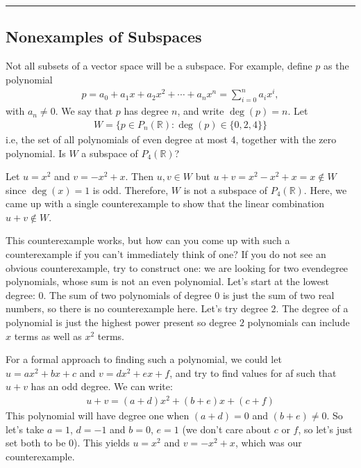\documentclass[letterpaper,10pt,english]{jupyterBook}
\begin{document}
\bigskip\hrule\bigskip



\subsection{Non\sphinxhyphen{}examples of Subspaces}
\label{\detokenize{_pages/5.2_Subspaces:non-examples-of-subspaces}}
\sphinxAtStartPar
Not all subsets of a vector space will be a subspace. For example, define \(p\) as the polynomial
\begin{equation*}
\begin{split} p=a_0 + a_1 x + a_2 x^2 + \cdots + a_n x^n = \sum_{i = 0}^n a_ix^i, \end{split}
\end{equation*}
\sphinxAtStartPar
with \(a_n\neq 0\). We say that \(p\) has degree \(n\), and write \(\operatorname{deg}(p)=n\). Let
\begin{equation*}
\begin{split} W = \{p \in P_n(\mathbb{R}) : \operatorname{deg}(p) \in \{0,2,4\}\} \end{split}
\end{equation*}
\sphinxAtStartPar
i.e, the set of all polynomials of even degree at most 4, together with the zero polynomial. Is \(W\) a subspace of \(P_4(\mathbb{R})\)?

\sphinxAtStartPar
Let \(u = x^2\) and \(v = -x ^ 2 + x\). Then \(u, v \in W\) but \(u + v = x^2 - x^2 + x = x \notin W\) since \(\operatorname{deg}(x) = 1\) is odd. Therefore, \(W\) is not a subspace of \(P_4(\mathbb{R})\). Here, we came up with a single counterexample to show that the linear combination \(u + v \notin W\).

\sphinxAtStartPar
This counterexample works, but how can you come up with such a counterexample if you can’t immediately think of one? If you do not see an obvious counterexample, try to construct one: we are looking for two even\sphinxhyphen{}degree polynomials, whose sum is not an even polynomial. Let’s start at the lowest degree: \(0\). The sum of two polynomials of degree \(0\) is just the sum of two real numbers, so there is no counterexample here. Let’s try degree \(2\). The degree of a polynomial is just the highest power present \sphinxhyphen{} so degree \(2\) polynomials can include \(x\) terms as well as \(x^2\) terms.

\sphinxAtStartPar
For a formal approach to finding such a polynomial, we could let \(u = ax^2 + bx + c\) and \(v = dx^2 + ex + f\), and try to find values for a\sphinxhyphen{}f such that \(u + v\) has an odd degree. We can write:
\begin{equation*}
\begin{split} u + v = (a + d)x^2 + (b + e)x + (c + f) \end{split}
\end{equation*}
\sphinxAtStartPar
This polynomial will have degree one when \((a + d) = 0\) and \((b + e) \neq 0\). So let’s take \(a = 1\), \(d = -1\) and \(b = 0\), \(e = 1\) (we don’t care about \(c\) or \(f\), so let’s just set both to be 0). This yields \(u = x^2\) and \(v = -x^2 + x\), which was our counterexample.
\end{document}
